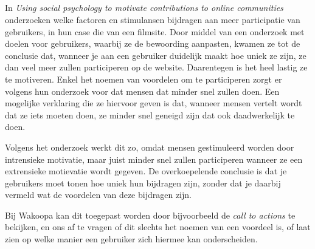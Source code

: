 \documentclass[a4paper, 10pt, pdftex]{report}
\begin{document}
      \subsection{\cite{Beenen2004}}

      In \emph{Using social psychology to motivate contributions to online communities} onderzoeken \citeauthor{Beenen2004} welke factoren en stimulansen bijdragen aan meer participatie van gebruikers, in hun case die van een filmsite. Door middel van een onderzoek met doelen voor gebruikers, waarbij ze de bewoording aanpasten, kwamen ze tot de conclusie dat, wanneer je aan een gebruiker duidelijk maakt hoe uniek ze zijn, ze dan veel meer zullen participeren op de website. Daarentegen is het heel lastig ze te motiveren. Enkel het noemen van voordelen om te participeren zorgt er volgens hun onderzoek voor dat mensen dat minder snel zullen doen. Een mogelijke verklaring die ze hiervoor geven is dat, wanneer mensen vertelt wordt dat ze iets moeten doen, ze minder snel geneigd zijn dat ook daadwerkelijk te doen.

      Volgens het onderzoek werkt dit zo, omdat mensen gestimuleerd worden door intrensieke motivatie, maar juist minder snel zullen participeren wanneer ze een extrensieke motievatie wordt gegeven. De overkoepelende conclusie is dat je gebruikers moet tonen hoe uniek hun bijdragen zijn, zonder dat je daarbij vermeld wat de voordelen van deze bijdragen zijn.

      Bij Wakoopa kan dit toegepast worden door bijvoorbeeld de \emph{call to actions} te bekijken, en ons af te vragen of dit slechts het noemen van een voordeel is, of laat zien op welke manier een gebruiker zich hiermee kan onderscheiden.

     \subsection{\cite{Sohn2005}}
\end{document}
